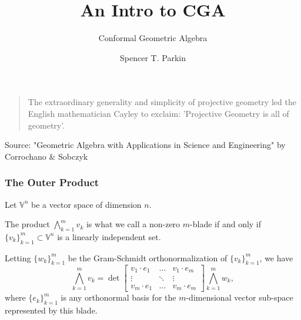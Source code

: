 \documentclass{beamer}
\title{An Intro to CGA}
\subtitle{Conformal Geometric Algebra}
\author{Spencer T. Parkin}
\institute{Avalanche Software}
\newcommand{\V}{\mathbb{V}}
\begin{document}
\frame{\titlepage}


\begin{frame}
\begin{quotation}
The extraordinary generality and simplicity of projective geometry led
the English mathematician Cayley to exclaim: 'Projective Geometry is all of geometry'.
\end{quotation}
Source: "Geometric Algebra with Applications in Science and Engineering" by Corrochano \& Sobczyk
\end{frame}



\begin{frame}
\frametitle{The Outer Product}
Let $\V^n$ be a vector space of dimension $n$.
\pause
\begin{definition}
The product $\bigwedge_{k=1}^m v_k$ is what we call a non-zero $m$-blade if and only if
$\{v_k\}_{k=1}^m\subset\V^n$ is a linearly independent set.
\end{definition}
\pause
\begin{definition}
Letting $\{w_k\}_{k=1}^m$ be the Gram-Schmidt orthonormalization of $\{v_k\}_{k=1}^m$,
we have
\begin{equation*}
\bigwedge_{k=1}^m v_k = \det\left[
\begin{array}{ccc}
v_1\cdot e_1 & \dots & v_1\cdot e_m \\
\vdots & \ddots & \vdots \\
v_m\cdot e_1 & \dots & v_m\cdot e_m
\end{array}
\right]\bigwedge_{k=1}^m w_k,
\end{equation*}
where $\{e_k\}_{k=1}^m$ is any orthonormal basis for the $m$-dimensional
vector sub-space represented by this blade.
\end{definition}
\end{frame}
\end{document}
